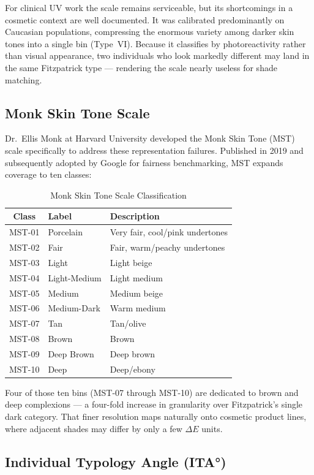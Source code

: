 For clinical UV work the scale remains serviceable, but its shortcomings in a cosmetic context are well documented. It was calibrated predominantly on Caucasian populations, compressing the enormous variety among darker skin tones into a single bin (Type~VI). Because it classifies by photoreactivity rather than visual appearance, two individuals who look markedly different may land in the same Fitzpatrick type — rendering the scale nearly useless for shade matching.

\subsection{Monk Skin Tone Scale}

Dr.\ Ellis Monk at Harvard University developed the Monk Skin Tone (MST) scale specifically to address these representation failures. Published in 2019 and subsequently adopted by Google for fairness benchmarking, MST expands coverage to ten classes:

\begin{table}[h]
\centering
\begin{tabular}{|c|l|l|}
\hline
\textbf{Class} & \textbf{Label} & \textbf{Description} \\
\hline
MST-01 & Porcelain & Very fair, cool/pink undertones \\
MST-02 & Fair & Fair, warm/peachy undertones \\
MST-03 & Light & Light beige \\
MST-04 & Light-Medium & Light medium \\
MST-05 & Medium & Medium beige \\
MST-06 & Medium-Dark & Warm medium \\
MST-07 & Tan & Tan/olive \\
MST-08 & Brown & Brown \\
MST-09 & Deep Brown & Deep brown \\
MST-10 & Deep & Deep/ebony \\
\hline
\end{tabular}
\caption{Monk Skin Tone Scale Classification}
\end{table}

Four of those ten bins (MST-07 through MST-10) are dedicated to brown and deep complexions — a four-fold increase in granularity over Fitzpatrick's single dark category. That finer resolution maps naturally onto cosmetic product lines, where adjacent shades may differ by only a few $\Delta E$ units.

\subsection{Individual Typology Angle (ITA°)}

